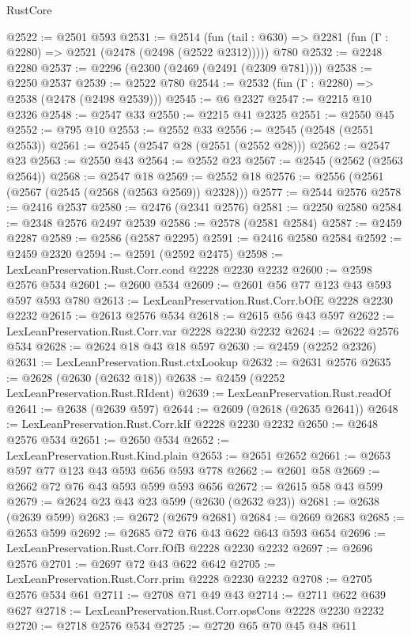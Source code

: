 \begin{lexlean}{RustCore}
\begin{coremodule}
@2522 := @2501 @593
@2531 := @2514
    (fun (tail : @630) => @2281 (fun (Γ : @2280) => @2521 (@2478 (@2498 (@2522 @2312)))))
    @780
@2532 := @2248 @2280
@2537 := @2296 (@2300 (@2469 (@2491 (@2309 @781))))
@2538 := @2250 @2537
@2539 := @2522 @780
@2544 := @2532 (fun (Γ : @2280) => @2538 (@2478 (@2498 @2539)))
@2545 := @6 @2327
@2547 := @2215 @10 @2326
@2548 := @2547 @33
@2550 := @2215 @41 @2325
@2551 := @2550 @45
@2552 := @795 @10
@2553 := @2552 @33
@2556 := @2545 (@2548 (@2551 @2553))
@2561 := @2545 (@2547 @28 (@2551 (@2552 @28)))
@2562 := @2547 @23
@2563 := @2550 @43
@2564 := @2552 @23
@2567 := @2545 (@2562 (@2563 @2564))
@2568 := @2547 @18
@2569 := @2552 @18
@2576 := @2556 (@2561 (@2567 (@2545 (@2568 (@2563 @2569)) @2328)))
@2577 := @2544 @2576
@2578 := @2416 @2537
@2580 := @2476 (@2341 @2576)
@2581 := @2250 @2580
@2584 := @2348 @2576 @2497 @2539
@2586 := @2578 (@2581 @2584)
@2587 := @2459 @2287
@2589 := @2586 (@2587 @2295)
@2591 := @2416 @2580 @2584
@2592 := @2459 @2320
@2594 := @2591 (@2592 @2475)
@2598 := LexLeanPreservation.Rust.Corr.cond @2228 @2230 @2232
@2600 := @2598 @2576 @534
@2601 := @2600 @534
@2609 := @2601 @56 @77 @123 @43 @593 @597 @593 @780
@2613 := LexLeanPreservation.Rust.Corr.bOfE @2228 @2230 @2232
@2615 := @2613 @2576 @534
@2618 := @2615 @56 @43 @597
@2622 := LexLeanPreservation.Rust.Corr.var @2228 @2230 @2232
@2624 := @2622 @2576 @534
@2628 := @2624 @18 @43 @18 @597
@2630 := @2459 (@2252 @2326)
@2631 := LexLeanPreservation.Rust.ctxLookup
@2632 := @2631 @2576
@2635 := @2628 (@2630 (@2632 @18))
@2638 := @2459 (@2252 LexLeanPreservation.Rust.RIdent)
@2639 := LexLeanPreservation.Rust.readOf
@2641 := @2638 (@2639 @597)
@2644 := @2609 (@2618 (@2635 @2641))
@2648 := LexLeanPreservation.Rust.Corr.kIf @2228 @2230 @2232
@2650 := @2648 @2576 @534
@2651 := @2650 @534
@2652 := LexLeanPreservation.Rust.Kind.plain
@2653 := @2651 @2652
@2661 := @2653 @597 @77 @123 @43 @593 @656 @593 @778
@2662 := @2601 @58
@2669 := @2662 @72 @76 @43 @593 @599 @593 @656
@2672 := @2615 @58 @43 @599
@2679 := @2624 @23 @43 @23 @599 (@2630 (@2632 @23))
@2681 := @2638 (@2639 @599)
@2683 := @2672 (@2679 @2681)
@2684 := @2669 @2683
@2685 := @2653 @599
@2692 := @2685 @72 @76 @43 @622 @643 @593 @654
@2696 := LexLeanPreservation.Rust.Corr.fOfB @2228 @2230 @2232
@2697 := @2696 @2576
@2701 := @2697 @72 @43 @622 @642
@2705 := LexLeanPreservation.Rust.Corr.prim @2228 @2230 @2232
@2708 := @2705 @2576 @534 @61
@2711 := @2708 @71 @49 @43
@2714 := @2711 @622 @639 @627
@2718 := LexLeanPreservation.Rust.Corr.opsCons @2228 @2230 @2232
@2720 := @2718 @2576 @534
@2725 := @2720 @65 @70 @45 @48 @611

\end{coremodule}
\end{lexlean}
